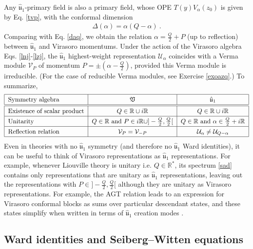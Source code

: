 \documentclass[12pt, a4paper, notitlepage, twoside]{report}
\numberwithin{equation}{section}
\theoremstyle{break}
\begin{document}
Any $\hat{\mathfrak{u}}_1$-primary field is also a primary field, whose OPE $T(y)V_\alpha(z_0)$ is given by Eq. \eqref{tvp}, with the conformal dimension 
\begin{align}
 \Delta(\alpha) = \alpha(Q-\alpha)\ .
 \label{daqu}
\end{align}
Comparing with
Eq. \eqref{daq}, we obtain the relation $\alpha = \frac{Q}{2}+P$ (up to reflection) between $\hat{\mathfrak{u}}_1$ and Virasoro momentums. 
Under the action of the Virasoro algebra Eqs. \eqref{lnj}-\eqref{lzj}, the $\hat{\mathfrak{u}}_1$ highest-weight representation $\mathcal{U}_\alpha$ coincides with a Verma module $\mathcal{V}_P$ of momentum $P=\pm(\alpha-\frac{Q}{2})$, provided this Verma module is irreducible. (For the case of reducible Verma modules, see Exercise \ref{exoazq}.)
To summarize,
\begin{align}
\renewcommand{\arraystretch}{1.3}
 \begin{tabular}{|l|c|c|}
  \hline
 Symmetry algebra  & $\mathfrak{V}$ & $\hat{\mathfrak{u}}_1 $
\\
\hline\hline
 Existence of scalar product & $Q\in {\mathbb{R}} \cup i{\mathbb{R}} $ & $Q\in {\mathbb{R}} \cup i{\mathbb{R}}$ 
\\
\hline
 Unitarity & $Q\in\mathbb{R}$ and $P\in i{\mathbb{R}} \cup ]-\frac{Q}{2},\frac{Q}{2}[ $ &  $Q\in\mathbb{R}$ and $\alpha \in \frac{Q}{2}+i{\mathbb{R}}$
\\
\hline 
 Reflection relation  & $\mathcal{V}_P = \mathcal{V}_{-P} $ & $\mathcal{U}_\alpha \neq \mathcal{U}_{Q-\alpha} $ 
\\
\hline
 \end{tabular}
\end{align}
Even in theories with no $\hat{\mathfrak{u}}_1$ symmetry (and therefore no $\hat{\mathfrak{u}}_1$ Ward identities), 
it can be useful to think of Virasoro representations as $\hat{\mathfrak{u}}_1$ representations. 
For example,
whenever Liouville theory is unitary i.e. $Q\in\mathbb{R}^*$, its spectrum \eqref{sad} contains only representations that are unitary as $\hat{\mathfrak{u}}_1$ representations, leaving out the representations with $P\in ]-\frac{Q}{2}, \frac{Q}{2}[$ although they are unitary as Virasoro representations. 
For example, the AGT relation leads to an expression for Virasoro conformal blocks as sums over particular descendant states, and these states simplify when written in terms of $\hat{\mathfrak{u}}_1$ creation modes \cite{aflt10}.


\subsection{Ward identities and Seiberg--Witten equations}
\end{document}
